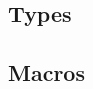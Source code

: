 \def\Subsection#1{\subsection{#1}}

\Subsection{Types}

\enlargethispage*{\baselineskip}
\Subsection{Macros}
\pagebreak
